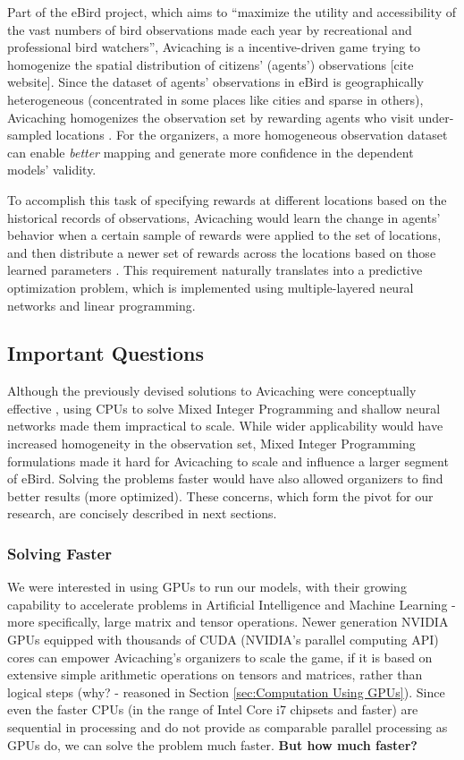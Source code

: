 \documentclass[12pt]{article}
\begin{document}
    Part of the eBird project, which aims to ``maximize the utility and accessibility of the vast numbers of bird observations made each year by recreational and professional bird watchers'', Avicaching is a incentive-driven game trying to homogenize the spatial distribution of citizens' (agents') observations [cite website]. Since the dataset of agents' observations in eBird is geographically heterogeneous (concentrated in some places like cities and sparse in others), Avicaching homogenizes the observation set by rewarding agents who visit under-sampled locations \cite{Xue2016Avi1}. For the organizers, a more homogeneous observation dataset can enable \textit{better} mapping and generate more confidence in the dependent models' validity. 
    
    To accomplish this task of specifying rewards at different locations based on the historical records of observations, Avicaching would learn the change in agents' behavior when a certain sample of rewards were applied to the set of locations, and then distribute a newer set of rewards across the locations based on those learned parameters \cite{Xue2016Avi2}. This requirement naturally translates into a predictive optimization problem, which is implemented using multiple-layered neural networks and linear programming.
    
    \subsection{Important Questions}
    Although the previously devised solutions to Avicaching were conceptually effective \cite{Xue2016Avi1}\cite{Xue2016Avi2}, using CPUs to solve Mixed Integer Programming and shallow neural networks made them impractical to scale. While wider applicability would have increased homogeneity in the observation set, Mixed Integer Programming formulations made it hard for Avicaching to scale and influence a larger segment of eBird. Solving the problems faster would have also allowed organizers to find better results (more optimized). These concerns, which form the pivot for our research, are concisely described in next sections.
    
    \subsubsection{Solving Faster} \label{sec:Important Questions - Solving Faster}
    We were interested in using GPUs to run our models, with their growing capability to accelerate problems in Artificial Intelligence and Machine Learning - more specifically, large matrix and tensor operations. Newer generation NVIDIA GPUs equipped with thousands of CUDA (NVIDIA's parallel computing API) cores can empower Avicaching's organizers to scale the game, if it is based on extensive simple arithmetic operations on tensors and matrices, rather than logical steps (why? - reasoned in Section \ref{sec:Computation Using GPUs}). Since even the faster CPUs (in the range of Intel Core i7 chipsets and faster) are sequential in processing and do not provide as comparable parallel processing as GPUs do, we can solve the problem much faster. \textbf{But how much faster?}
    
\end{document}
